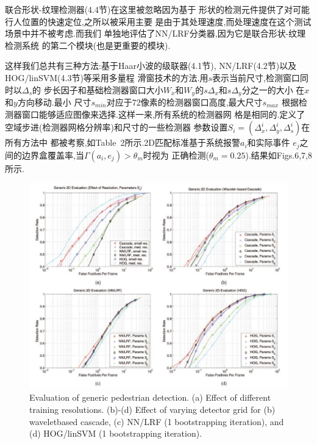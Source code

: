 \documentclass[10pt,letterpaper,journal,compsoc]{IEEEtran}
\begin{document}
联合形状-纹理检测器(4.4节)在这里被忽略因为基于
形状的检测元件提供了对可能行人位置的快速定位,之所以被采用主要
是由于其处理速度,而处理速度在这个测试场景中并不被考虑.而我们
单独地评估了NN/LRF分类器,因为它是联合形状-纹理检测系统
的第二个模块(也是更重要的模块).

这样我们总共有三种方法:基于Haar小波的级联器(4.1节),
NN/LRF(4.2节)以及HOG/linSVM(4.3节)等采用多量程
滑窗技术的方法.用$s$表示当前尺寸,检测窗口同时以$\Delta_s$的
步长因子和基础检测器窗口大小$W_x$和$W_y$的$s\Delta_x$和$s\Delta_y$分之一的大小
在$x$和$y$方向移动.最小
尺寸$s_{min}$对应于72像素的检测器窗口高度,最大尺寸$s_{max}$
根据检测器窗口能够适应图像来选择.这样一来,所有系统的检测器网
格是相同的.定义了空域步进(检测器网格分辨率)和尺寸的一些检测器
参数设置$S_i=(\Delta^i_x,\Delta^i_y,\Delta^i_s)$在所有方法中
都被考察,如Table~2所示.2D匹配标准基于系统报警$a_i$和实际事件
$e_j$之间的边界盒覆盖率,当$\Gamma(a_i,e_j)>\theta_m$时视为
正确检测($\theta_m=0.25$).结果如Figs.6,7,8所示.
\begin{figure}[!t]
\centering
\includegraphics[width=6in]{fig6.JPG}
\caption{Evaluation of generic pedestrian detection. (a) Effect of different training resolutions. (b)-(d) Effect of varying detector grid for (b) waveletbased
cascade, (c) NN/LRF (1 bootstrapping iteration), and (d) HOG/linSVM (1 bootstrapping iteration).}
\end{figure}
\end{document}

